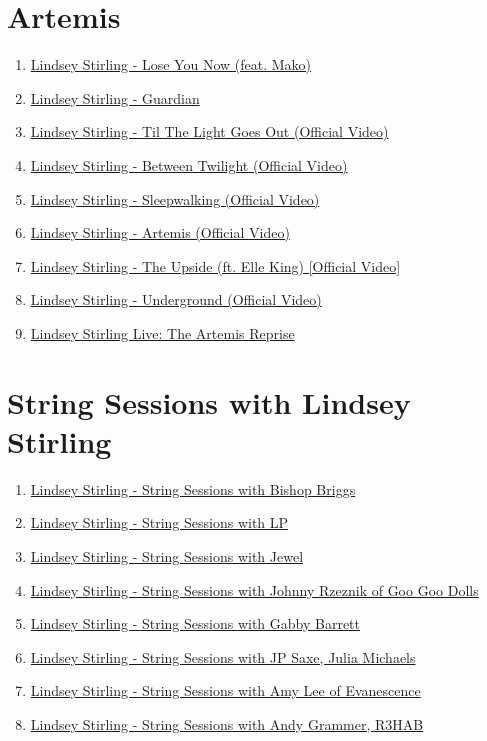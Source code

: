 \documentclass{book}
\numberwithin{equation}{section}
\begin{document}
\section{Artemis}
\begin{enumerate}
    \item \href{https://www.youtube.com/watch?v=JEexIgFkMjI}{Lindsey Stirling - Lose You Now (feat. Mako)}
    \item \href{https://www.youtube.com/watch?v=VgzTfdzj_Ho}{Lindsey Stirling - Guardian}
    \item \href{https://www.youtube.com/watch?v=oQrIbBqV2Ew}{Lindsey Stirling - Til The Light Goes Out (Official Video)}
    \item \href{https://www.youtube.com/watch?v=b50Gb3bPNI8}{Lindsey Stirling - Between Twilight (Official Video)}
    \item \href{https://www.youtube.com/watch?v=jyvcg72-reA}{Lindsey Stirling - Sleepwalking (Official Video)}
    \item \href{https://www.youtube.com/watch?v=VsN7E35LpJE}{Lindsey Stirling - Artemis (Official Video)}
    \item \href{https://www.youtube.com/watch?v=R8ALe-nVzd8}{Lindsey Stirling - The Upside (ft. Elle King) [Official Video]}
    \item \href{https://www.youtube.com/watch?v=EJ09pSuA9hw}{Lindsey Stirling - Underground (Official Video)}
    \item \href{https://www.youtube.com/watch?v=TGNJbrZnIJg}{Lindsey Stirling Live: The Artemis Reprise}
\end{enumerate}

\section{String Sessions with Lindsey Stirling}
\begin{enumerate}
    \item \href{https://www.youtube.com/watch?v=lxC6AT_aasM}{Lindsey Stirling - String Sessions with Bishop Briggs}
    \item \href{https://www.youtube.com/watch?v=VzPZoffAHn4}{Lindsey Stirling - String Sessions with LP}
    \item \href{https://www.youtube.com/watch?v=zyWiwuW2ULI}{Lindsey Stirling - String Sessions with Jewel}
    \item \href{https://www.youtube.com/watch?v=QU9oIvnXKYk}{Lindsey Stirling - String Sessions with Johnny Rzeznik of Goo Goo Dolls}
    \item \href{https://www.youtube.com/watch?v=9JRN8Cymj_8}{Lindsey Stirling - String Sessions with Gabby Barrett}
    \item \href{https://www.youtube.com/watch?v=U6hMlduQZ2k}{Lindsey Stirling - String Sessions with JP Saxe, Julia Michaels}
    \item \href{https://www.youtube.com/watch?v=t2N99PZpQ_A}{Lindsey Stirling - String Sessions with Amy Lee of Evanescence}
    \item \href{https://www.youtube.com/watch?v=57tA4w5ZF0c}{Lindsey Stirling - String Sessions with Andy Grammer, R3HAB}
\end{enumerate}
\end{document}

